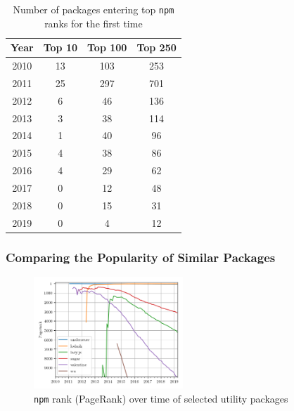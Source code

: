 \documentclass[10pt,conference]{IEEEtran}
\def\code#1{\texttt{#1}}
\begin{document}
\begin{table}
  \centering
  \begin{tabular}{c|c|c|c}
    Year & Top 10 & Top 100 & Top 250 \\
    \hline
    2010 & 13 & 103 & 253\\
    2011 & 25 & 297 & 701\\
    2012 & 6 & 46 & 136\\
    2013 & 3 & 38 & 114\\
    2014 & 1 & 40 & 96\\
    2015 & 4 & 38 & 86\\
    2016 & 4 & 29 & 62\\
    2017 & 0 & 12 & 48\\
    2018 & 0 & 15 & 31\\
    2019 & 0 & 4 & 12\\
  \end{tabular}
  \caption{Number of packages entering top \code{npm} ranks for the first time}
  \label{numEnteringTop}
\end{table}


\subsubsection{Comparing the Popularity of Similar Packages}

\begin{figure}
  \includegraphics[width=0.5\textwidth]{figures/select_packages.png}
  \caption{\code{npm} rank (PageRank) over time of selected utility packages}
  \label{selectPackages}
\end{figure}
\end{document}
